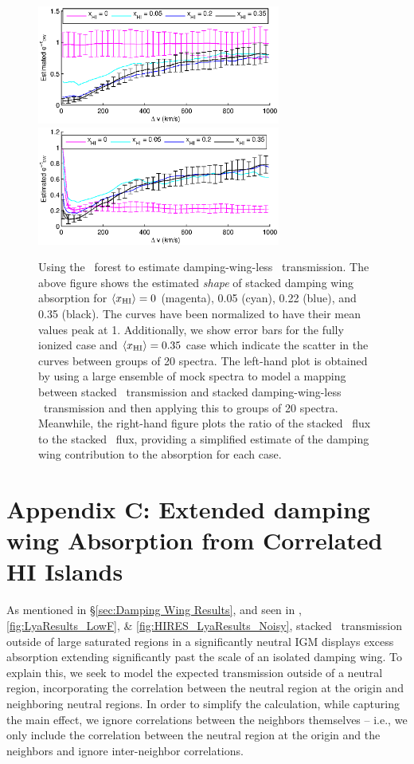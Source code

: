 \begin{figure}[h]
  \centering
  \includegraphics[width=8cm]{fig12a.eps}
  \includegraphics[width=8cm]{fig12b.eps}
  \caption{Using the \lyb\ forest to estimate damping-wing-less \lya\ transmission. The above figure shows the estimated \textit{shape} of stacked damping wing absorption for $\langle x_{\text{HI}}\rangle = 0$ (magenta), 0.05 (cyan), 0.22 (blue), and 0.35 (black). The curves have been normalized to have their mean values peak at 1. Additionally, we show error bars for the fully ionized case and $\langle x_{\text{HI}}\rangle = 0.35$ case which indicate the scatter in the curves between groups of 20 spectra. The left-hand plot is obtained by using a large ensemble of mock spectra to model a mapping between stacked \lyb\ transmission and stacked damping-wing-less \lya\ transmission and then applying this to groups of 20 spectra. Meanwhile, the right-hand figure plots the ratio of the stacked \lya\ flux to the stacked \lyb\ flux, providing a simplified estimate of the damping wing contribution to the absorption for each case. }
  \label{fig:DWShape}
\end{figure}


\section*{Appendix C: Extended damping wing Absorption from Correlated HI Islands} \label{sec:Correlation}


As mentioned in \S\ref{sec:Damping Wing Results}, and seen in , \ref{fig:LyaResults_LowF}, \& \ref{fig:HIRES_LyaResults_Noisy}, stacked \lya\ transmission outside of large saturated regions in a significantly neutral IGM displays excess absorption extending significantly past the scale of an isolated damping wing. To explain this, we seek to model the expected transmission outside of a neutral region, incorporating the correlation between the neutral region at the origin and neighboring neutral regions.  In order to simplify the calculation, while capturing the main effect, we ignore correlations between the neighbors themselves -- i.e., we only include the correlation between the neutral region at the origin and the neighbors and ignore inter-neighbor correlations.

